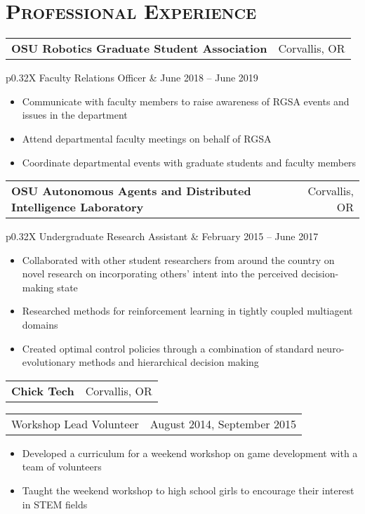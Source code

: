 \documentclass[letterpaper,10pt,titlepage]{article}
\newcommand{\leftW}{0.32\textwidth}
\begin{document}
\section*{\textsc{Professional Experience}}

\begin{tabularx}{\linewidth}{Xr}
	\textbf{OSU Robotics Graduate Student Association} & Corvallis, OR\\
\end{tabularx}
\begin{tabularx}{\linewidth}{p{\leftW}X}
Faculty Relations Officer          & June 2018 -- June 2019\\
\end{tabularx}
\begin{itemize} \itemsep1pt \parskip0pt 
\item Communicate with faculty members to raise awareness of RGSA events and issues in the department
\item Attend departmental faculty meetings on behalf of RGSA
\item Coordinate departmental events with graduate students and faculty members
\end{itemize}

\begin{tabularx}{\linewidth}{Xr}
	\textbf{OSU Autonomous Agents and Distributed Intelligence Laboratory} & Corvallis, OR\\
\end{tabularx}
\begin{tabularx}{\linewidth}{p{\leftW}X}
Undergraduate Research Assistant          & February 2015 -- June 2017\\
\end{tabularx}
\begin{itemize} \itemsep1pt \parskip0pt 
\item Collaborated with other student researchers from around the country on novel research on incorporating others' intent into the perceived decision-making state
\item Researched methods for reinforcement learning in tightly coupled multiagent domains
\item Created optimal control policies through a combination of standard neuro-evolutionary methods and hierarchical decision making
\end{itemize}

\begin{tabularx}{\linewidth}{Xr}
	\textbf{Chick Tech} & Corvallis, OR\\
\end{tabularx}
\begin{tabularx}{\linewidth}{p{\leftW}X}
Workshop Lead Volunteer          &  August 2014, September 2015\\
\end{tabularx}
\begin{itemize} \itemsep1pt \parskip0pt 
\item Developed a curriculum for a weekend workshop on game development with a team of volunteers
\item Taught the weekend workshop to high school girls to encourage their interest in STEM fields
\end{itemize}
\end{document}
